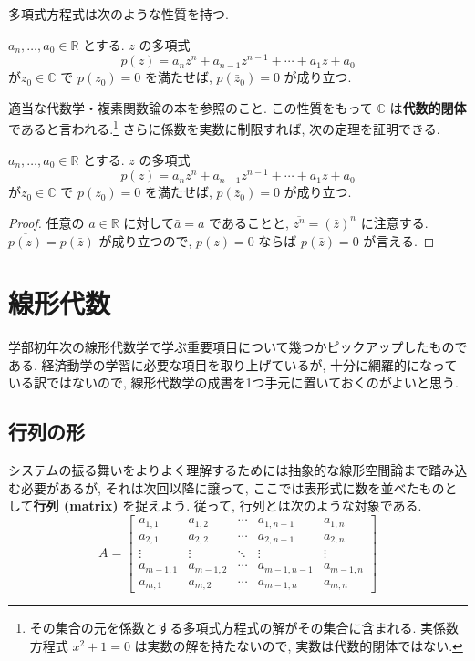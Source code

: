 \documentclass[a4paper]{scrbook}
\theoremstyle{definition}
\let\BeginKnitrBlock\begin \let\EndKnitrBlock\end
\begin{document}
多項式方程式は次のような性質を持つ. \BeginKnitrBlock{theorem}

\protect\hypertarget{thm:unnamed-chunk-36}{}{\label{thm:unnamed-chunk-36}}\(a_n, \dots, a_0 \in \mathbb R\)
とする. \(z\) の多項式 \[
  p(z) = a_n z^n + a_{n-1} z^{n-1} + \cdots + a_1 z + a_0
\] が\(z_0 \in \mathbb C\) で \(p(z_0) = 0\) を満たせば,
\(p(\bar z_0) = 0\) が成り立つ.
\EndKnitrBlock{theorem}

適当な代数学・複素関数論の本を参照のこと. この性質をもって \(\mathbb C\)
は\textbf{代数的閉体}であると言われる.\footnote{その集合の元を係数とする多項式方程式の解がその集合に含まれる.
  実係数方程式 \(x^2 + 1 = 0\) は実数の解を持たないので,
  実数は代数的閉体ではない.} さらに係数を実数に制限すれば,
次の定理を証明できる.

\BeginKnitrBlock{theorem}
\protect\hypertarget{thm:unnamed-chunk-37}{}{\label{thm:unnamed-chunk-37}}\(a_n, \dots, a_0 \in \mathbb R\)
とする. \(z\) の多項式 \[
  p(z) = a_n z^n + a_{n-1} z^{n-1} + \cdots + a_1 z + a_0
\] が\(z_0 \in \mathbb C\) で \(p(z_0) = 0\) を満たせば,
\(p(\bar z_0) = 0\) が成り立つ.
\EndKnitrBlock{theorem}

\BeginKnitrBlock{proof}
\iffalse {証明. } \fi 任意の \(a \in \mathbb R\) に対して\(\bar a = a\)
であることと, \(\overline{z^n} = (\bar z)^n\) に注意する.
\(\overline{p(z)} = p(\bar z)\) が成り立つので, \(p(z) = 0\) ならば
\(p(\bar z) = 0\) が言える.
\EndKnitrBlock{proof}

\chapter{線形代数}\label{matrix}

学部初年次の線形代数学で学ぶ重要項目について幾つかピックアップしたものである.
経済動学の学習に必要な項目を取り上げているが,
十分に網羅的になっている訳ではないので,
線形代数学の成書を1つ手元に置いておくのがよいと思う.

\section{行列の形}

システムの振る舞いをよりよく理解するためには抽象的な線形空間論まで踏み込む必要があるが,
それは次回以降に譲って, ここでは表形式に数を並べたものとして\textbf{行列
(matrix)} を捉えよう. 従って, 行列とは次のような対象である. \[
A=\begin{bmatrix}a_{1,1} & a_{1,2} & \cdots & a_{1,n-1} & a_{1,n}\\
a_{2,1} & a_{2,2} & \cdots & a_{2,n-1} & a_{2,n}\\
\vdots & \vdots & \ddots & \vdots & \vdots\\
a_{m-1,1} & a_{m-1,2} & \cdots & a_{m-1,n-1} & a_{m-1,n}\\
a_{m,1} & a_{m,2} & \cdots & a_{m-1,n} & a_{m,n}
\end{bmatrix}
\]
\end{document}
